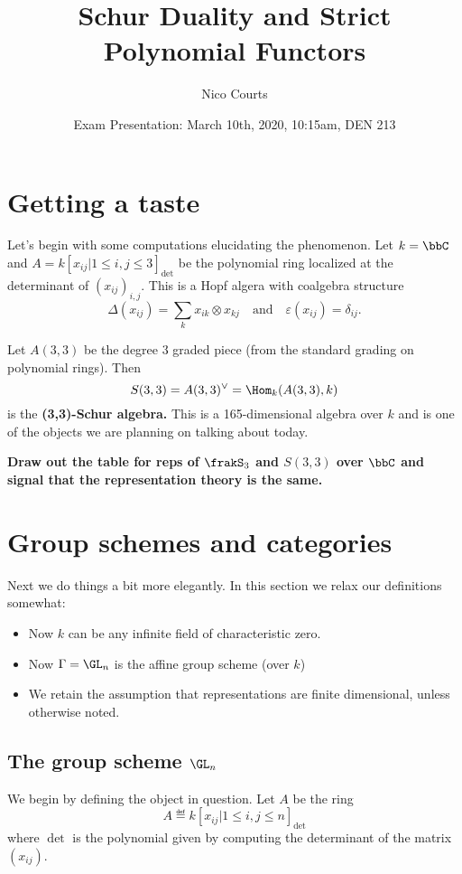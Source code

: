 \documentclass[12pt]{article}
\begin{document}
\title{Schur Duality and Strict Polynomial Functors}
\author{Nico Courts}
\date{Exam Presentation: March 10th, 2020, 10:15am, DEN 213}
\maketitle

\setcounter{tocdepth}{2}
\tableofcontents

\newpage

\section{Getting a taste}
Let's begin with some computations elucidating the phenomenon. Let $k=\bbC$ and $A=k[x_{ij}|1\le i,j\le 3]_{\det}$ be the polynomial ring localized 
at the determinant of $(x_{ij})_{i,j}$. This is a Hopf algera with coalgebra structure 
\[\Delta(x_{ij})=\sum_k x_{ik}\otimes x_{kj}\quad\text{and}\quad \varepsilon(x_{ij})=\delta_{ij}.\]

Let $A(3,3)$ be the degree $3$ graded piece (from the standard grading on polynomial rings). Then 
\[S(3,3)=A(3,3)^\vee=\Hom_k(A(3,3),k)\]
is the \textbf{(3,3)-Schur algebra.} This is a 165-dimensional algebra over $k$ and is one of the objects we are 
planning on talking about today.

\textbf{Draw out the table for reps of $\frakS_3$ and $S(3,3)$ over $\bbC$ and signal that the representation theory is the same.}
\newpage


\section{Group schemes and categories}
	Next we do things a bit more elegantly. In this section we relax our definitions somewhat:
	\begin{itemize}
		\item Now $k$ can be any infinite field of characteristic zero.
		\item Now $\Gamma=\GL_n$ is the affine group scheme (over $k$)
		\item We retain the assumption that representations are finite dimensional, unless otherwise noted.
	\end{itemize}
	\subsection{The group scheme \texorpdfstring{$\GL_n$}{GLn}}
	We begin by defining the object in question. Let $A$ be the ring 
	\[A\eqdef k[x_{ij}|1\le i,j\le n]_{\det}\]
	where $\det$ is the polynomial given by computing the determinant of the matrix $(x_{ij})$.
\end{document}
